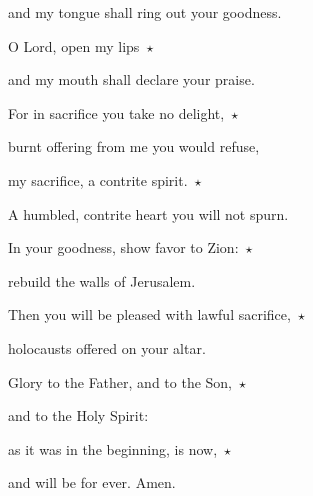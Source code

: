 and my tongue shall ring out your goodness. 

\noindent O Lord, open my lips~$\star$~\nopagebreak

and my mouth shall declare your praise.

\noindent For in sacrifice you take no delight,~$\star$~\nopagebreak

burnt offering from me you would refuse,

\noindent my sacrifice, a contrite spirit.~$\star$~\nopagebreak

A humbled, contrite heart you will not spurn.

\noindent In your goodness, show favor to Zion:~$\star$~\nopagebreak

rebuild the walls of Jerusalem.

\noindent Then you will be pleased with lawful sacrifice,~$\star$~\nopagebreak

holocausts offered on your altar.

\noindent Glory to the Father, and to the Son,~$\star$~\nopagebreak

and to the Holy Spirit:

\noindent as it was in the beginning, is now,~$\star$~\nopagebreak

and will be for ever. Amen.